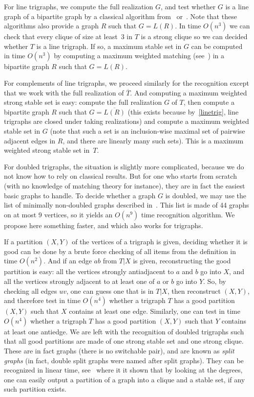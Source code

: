 \documentclass[11 pt] {article}
\begin{document}
For line trigraphs, we compute the full realization $G$, and test
whether $G$ is a line graph of a bipartite graph by a classical
algorithm from~\cite{lehot:root} or~\cite{roussopoulos:linegraphe}.
Note that these algorithms also provide a graph $R$ such that
$G=L(R)$.  In time $O(n^3)$ we can check that every clique of size at
least~3 in $T$ is a strong clique so we can decided whether $T$ is a
line trigraph.  If so, a maximum stable set in $G$ can be computed in
time $O(n^3)$ by computing a maximum weighted matching
(see~\cite{schrijver:opticomb}) in a bipartite graph $R$ such that $G=
L(R)$.

For complements of line trigraphs, we proceed similarly for the
recognition except that we work with the full realization of $\overline{T}$.  And
computing a maximum weighted strong stable set is easy: compute the
full realization $G$ of $T$, then compute a bipartite graph $R$ such
that $G = \overline{L(R)}$ (this exists because by~\ref{linetrig},
line trigraphs are closed under taking realizations) and compute a
maximum weighted stable set in $G$ (note that such a set is an
inclusion-wise maximal set of pairwise adjacent edges in $R$, and there are
linearly many such sets).  This is a maximum weighted strong stable
set in~$T$.

For doubled trigraphs, the situation is slightly more complicated,
because we do not know how to rely on classical results.  But for one
who starts from scratch (with no knowledge of matching theory for
instance), they are in fact the easiest basic graphs to handle.  To
decide whether a graph $G$ is doubled, we may use the list of
minimally non-doubled graphs described in~\cite{alexeevFK:doubled}.
This list is made of 44 graphs on at most 9 vertices, so it yields an
$O(n^9)$ time recognition algorithm.  We propose here something
faster, and which also works for trigraphs.

If a partition $(X,Y)$ of the vertices of a trigraph is given,
deciding whether it is good can be done by a brute force checking of
all items from the definition in time $O(n^2)$.  And if an edge $ab$
from $T|X$ is given, reconstructing the good partition is easy: all
the vertices strongly antiadjacent to $a$ and $b$ go into $X$, and all
the vertices strongly adjacent to at least one of $a$ or $b$ go into
$Y$.  So, by checking all edges $uv$, one can guess one that is in
$T|X$, then reconstruct $(X, Y)$, and therefore test in time $O(n^4)$
whether a trigraph $T$ has a good partition $(X, Y)$ such that $X$
contains at least one edge.  Similarly, one can test in time $O(n^4)$
whether a trigraph $T$ has a good partition $(X, Y)$ such that $Y$
contains at least one antiedge.  We are left with the recognition of
doubled trigraphs such that all good partitions are made of one strong
stable set and one strong clique.  These are in fact graphs (there is
no switchable pair), and are known as \emph{split graphs} (in fact,
double split graphs were named after split graphs).  They can be
recognized in linear time, see~\cite{hammerS:split} where it it shown
that by looking at the degrees, one can easily output a partition of a
graph into a clique and a stable set, if any such partition exists.
\end{document}
